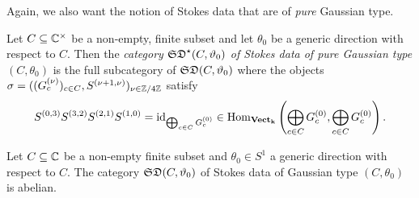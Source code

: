 Again, we also want the notion of Stokes data that are of \emph{pure} Gaussian type.

 \begin{defi} Let $C \subseteq \mathbb{C}^\times$ be a non-empty, finite subset and let $\theta_0$ be a generic direction with respect to $C$. Then the \emph{category $\mathfrak{SD}^\star(C,\vartheta_0)$ of Stokes data of pure Gaussian type $(C,\theta_0)$} is the full subcategory of $\mathfrak{SD}(C,\vartheta_0)$ where the objects $\sigma = ((G_c^{(\nu)})_{c \in C}, S^{(\nu+1, \nu)})_{\nu \in \mathbb{Z}/4\mathbb{Z}}$ satisfy 
 \[
S^{(0,3)}S^{(3,2)}S^{(2,1)}S^{(1,0)} = \operatorname{id}_{\bigoplus_{c\in C}G_c^{(0)}} \in \operatorname{Hom}_{\mathbf{Vect}_{\mathbf{k}}}\left(\bigoplus_{c\in C}G_c^{(0)},\bigoplus_{c\in C}G_c^{(0)}\right).
 \]
 \end{defi}


\begin{prop}\label{SDabelsch} Let $C \subseteq \mathbb{C}$ be a non-empty finite subset and $\theta_0 \in S^1$ a generic direction with respect to $C$. The category $\mathfrak{SD}(C,\vartheta_0)$ of Stokes data of Gaussian type $(C, \theta_0)$ is abelian.
\end{prop}

